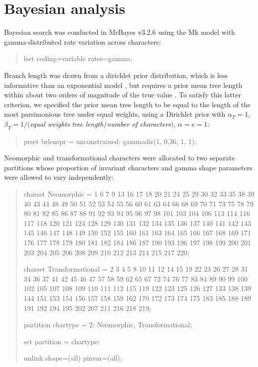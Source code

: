 \documentclass[openany]{book}
\theoremstyle{definition}
\theoremstyle{definition}
\theoremstyle{definition}
\theoremstyle{remark}
\begin{document}
\hypertarget{bayesian}{\chapter{Bayesian analysis}\label{bayesian}}

Bayesian search was conducted in MrBayes v3.2.6 \citep{Ronquist2012}
using the Mk model \citep{Lewis2001} with gamma-distributed rate
variation across characters:

\begin{quote}
lset coding=variable rates=gamma;
\end{quote}

Branch length was drawn from a dirichlet prior distribution, which is
less informative than an exponential model \citep{Rannala2012}, but
requires a prior mean tree length within about two orders of magnitude
of the true value \citep{Zhang2012}. To satisfy this latter criterion,
we specified the prior mean tree length to be equal to the length of the
most parsimonious tree under equal weights, using a Dirichlet prior with
\(\alpha_T = 1\), \(\beta_T = 1/(\)\emph{equal weights tree
length}\(/\)\emph{number of characters}\()\), \(\alpha = c = 1\):

\begin{quote}
prset brlenspr = unconstrained: gammadir(1, 0.36, 1, 1);
\end{quote}

Neomorphic and transformational characters
\citep[\emph{sensu}][]{Sereno2007} were allocated to two separate
partitions whose proportion of invariant characters and gamma shape
parameters were allowed to vary independently:

\begin{quote}
charset Neomorphic = 1 6 7 9 13 16 17 18 20 21 24 25 29 30 32 33 35 38
39 40 43 44 48 49 50 51 52 53 54 55 56 60 61 63 64 66 68 69 70 71 73 75
78 79 80 81 82 85 86 87 88 91 92 93 94 95 96 97 98 101 103 104 106 113
114 116 117 118 120 121 124 128 129 130 131 132 134 135 136 137 140 141
142 143 145 146 147 148 149 150 152 155 160 161 163 164 165 166 167 168
169 171 176 177 178 179 180 181 182 184 186 187 190 193 196 197 198 199
200 201 203 204 205 206 208 209 210 212 213 214 215 217 220;

charset Transformational = 2 3 4 5 8 10 11 12 14 15 19 22 23 26 27 28 31
34 36 37 41 42 45 46 47 57 58 59 62 65 67 72 74 76 77 83 84 89 90 99 100
102 105 107 108 109 110 111 112 115 119 122 123 125 126 127 133 138 139
144 151 153 154 156 157 158 159 162 170 172 173 174 175 183 185 188 189
191 192 194 195 202 207 211 216 218 219;

partition chartype = 2: Neomorphic, Transformational;

set partition = chartype;

unlink shape=(all) pinvar=(all);
\end{quote}
\end{document}
